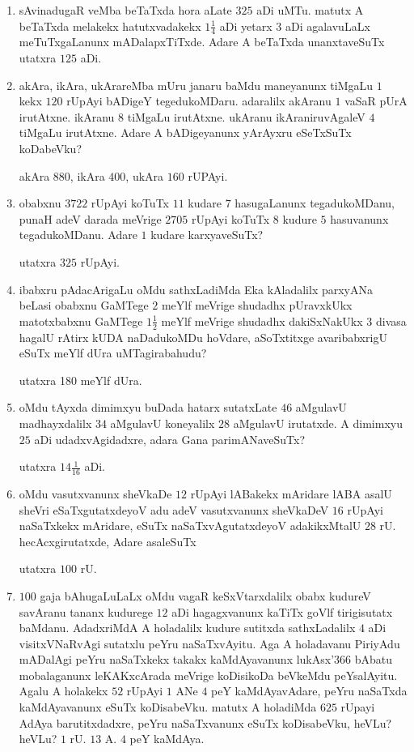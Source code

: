 \begin{enumerate}
\item sAvinadugaR veMba beTaTxda hora aLate $325$ aDi uMTu. matutx A
beTaTxda melakekx hatutxvadakekx $1\frac{1}{4}$ aDi yetarx $3$ aDi
agalavuLaLx meTuTxgaLanunx mADalapxTiTxde. Adare A beTaTxda
unanxtaveSuTx \hfill utatxra $125$ aDi.

\item akAra, ikAra, ukArareMba mUru janaru baMdu maneyanunx tiMgaLu
$1$ kekx $120$ rUpAyi bADigeY tegedukoMDaru. adaralilx akAranu $1$
vaSaR pUrA irutAtxne. ikAranu $8$ tiMgaLu irutAtxne. ukAranu
ikAraniruvAgaleV $4$ tiMgaLu irutAtxne. Adare A bADigeyanunx yArAyxru
eSeTxSuTx koDabeVku?

\hfill akAra $880$, ikAra $400$, ukAra $160$ rUPAyi.

\item obabxnu $3722$ rUpAyi koTuTx $11$ kudare $7$ hasugaLanunx
tegadukoMDanu, punaH adeV darada meVrige $2705$ rUpAyi koTuTx $8$
kudure $5$ hasuvanunx tegadukoMDanu. Adare $1$ kudare
karxyaveSuTx? 

\hfill utatxra $325$ rUpAyi.

\item ibabxru pAdacArigaLu oMdu sathxLadiMda Eka kAladalilx parxyANa
beLasi obabxnu GaMTege $2$ meYlf meVrige shudadhx pUravxkUkx
matotxbabxnu GaMTege $1\frac{1}{2}$ meYlf meVrige shudadhx
dakiSxNakUkx $3$ divasa hagalU rAtirx kUDA naDadukoMDu hoVdare,
aSoTxtitxge avaribabxrigU eSuTx meYlf dUra uMTagirabahudu? 

\hfill utatxra 180 meYlf dUra.

\item oMdu tAyxda dimimxyu buDada hatarx sutatxLate $46$ aMgulavU
madhayxdalilx $34$ aMgulavU koneyalilx $28$ aMgulavU irutatxde. A
dimimxyu $25$ aDi udadxvAgidadxre, adara Gana parimANaveSuTx?

\hfill utatxra $14\frac{1}{16}$ aDi.

\item oMdu vasutxvanunx sheVkaDe $12$ rUpAyi lABakekx mAridare lABA
asalU sheVri eSaTxgutatxdeyoV adu adeV vasutxvanunx sheVkaDeV $16$
rUpAyi naSaTxkekx mAridare, eSuTx naSaTxvAgutatxdeyoV adakikxMtalU
$28$ rU. hecAcxgirutatxde, Adare asaleSuTx

\hfill utatxra $100$ rU.

\item $100$ gaja bAhugaLuLaLx oMdu vagaR keSxVtarxdalilx obabx kudureV
savAranu tananx kudurege $12$ aDi hagagxvanunx kaTiTx goVlf
tirigisutatx baMdanu. AdadxriMdA A holadalilx kudure sutitxda
sathxLadalilx $4$ aDi visitxVNaRvAgi sutatxlu peYru naSaTxvAyitu. Aga
A holadavanu PiriyAdu mADalAgi peYru naSaTxkekx takakx kaMdAyavanunx
lukAsx\char'366 bAbatu mobalaganunx leKAKxcArada meVrige koDisikoDa beVkeMdu
peYsalAyitu. Agalu A holakekx $52$ rUpAyi $1$ ANe $4$ peY
kaMdAyavAdare, peYru naSaTxda kaMdAyavanunx eSuTx koDisabeVku. matutx
A holadiMda $625$ rUpayi AdAya barutitxdadxre, peYru naSaTxvanunx
eSuTx koDisabeVku, heVLu? heVLu? $1$ rU. $13$ A. $4$ peY kaMdAya. 


\end{enumerate}

